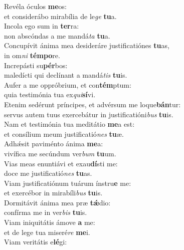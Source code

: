 \evenverse Revéla óculos \textbf{me}os:~\*\\
\evenverse et considerábo mirabília de le\textit{ge} \textbf{tu}a.\\
\oddverse Incola ego sum in \textbf{ter}ra:~\*\\
\oddverse non abscóndas a me mandá\textit{ta} \textbf{tu}a.\\
\evenverse Concupívit ánima mea desideráre justificatiónes \textbf{tu}as,~\*\\
\evenverse in om\textit{ni} \textbf{tém}\textbf{po}re.\\
\oddverse Increpásti su\textbf{pér}bos:~\*\\
\oddverse maledícti qui declínant a mandá\textit{tis} \textbf{tu}is.\\
\evenverse Aufer a me oppróbrium, et con\textbf{tém}ptum:~\*\\
\evenverse quia testimónia tua ex\textit{qui}\textbf{sí}vi.\\
\oddverse Etenim sedérunt príncipes, et advérsum me loque\textbf{bán}tur:~\*\\
\oddverse servus autem tuus exercebátur in justificatióni\textit{bus} \textbf{tu}is.\\
\evenverse Nam et testimónia tua meditátio \textbf{me}a est:~\*\\
\evenverse et consílium meum justificatió\textit{nes} \textbf{tu}æ.\\
\oddverse Adhǽsit paviménto ánima \textbf{me}a:~\*\\
\oddverse vivífica me secúndum ver\textit{bum} \textbf{tu}um.\\
\evenverse Vias meas enuntiávi et exau\textbf{dí}sti me:~\*\\
\evenverse doce me justificatió\textit{nes} \textbf{tu}as.\\
\oddverse Viam justificatiónum tuárum ínstru\textbf{e} me:~\*\\
\oddverse et exercébor in mirabíli\textit{bus} \textbf{tu}is.\\
\evenverse Dormitávit ánima mea præ \textbf{tǽ}dio:~\*\\
\evenverse confírma me in ver\textit{bis} \textbf{tu}is.\\
\oddverse Viam iniquitátis ámove \textbf{a} me:~\*\\
\oddverse et de lege tua miseré\textit{re} \textbf{me}i.\\
\evenverse Viam veritátis e\textbf{lé}gi:~\*\\
